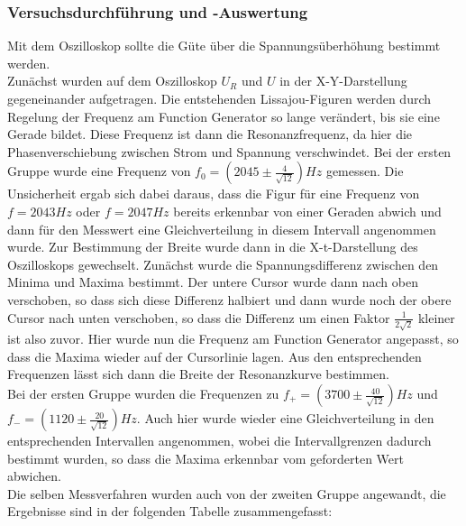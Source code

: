 \documentclass[a4paper, 11pt]{article}
\begin{document}
\subsubsection{Versuchsdurchführung und -Auswertung}
Mit dem Oszilloskop sollte die Güte über die Spannungsüberhöhung bestimmt werden. \\
Zunächst wurden auf dem Oszilloskop $U_R$ und $U$ in der X-Y-Darstellung gegeneinander aufgetragen. Die entstehenden Lissajou-Figuren werden durch Regelung der Frequenz am Function Generator so lange verändert, bis sie eine Gerade bildet. Diese Frequenz ist dann die Resonanzfrequenz, da hier die Phasenverschiebung zwischen Strom und Spannung verschwindet.
Bei der ersten Gruppe wurde eine Frequenz von $f_0 = (2045 \pm \frac{4}{\sqrt{12}}) Hz$ gemessen. Die Unsicherheit ergab sich dabei daraus, dass die Figur für eine Frequenz von $f = 2043 Hz$ oder $f = 2047 Hz$ bereits erkennbar von einer Geraden abwich und dann für den Messwert eine Gleichverteilung in diesem Intervall angenommen wurde.
Zur Bestimmung der Breite wurde dann in die X-t-Darstellung des Oszilloskops gewechselt. Zunächst wurde die Spannungsdifferenz zwischen den Minima und Maxima bestimmt. Der untere Cursor wurde dann nach oben verschoben, so dass sich diese Differenz halbiert und dann wurde noch der obere Cursor nach unten verschoben, so dass die Differenz um einen Faktor $\frac{1}{2\sqrt{2}}$ kleiner ist also zuvor. Hier wurde nun die Frequenz am Function Generator angepasst, so dass die Maxima wieder auf der Cursorlinie lagen. Aus den entsprechenden Frequenzen lässt sich dann die Breite der Resonanzkurve bestimmen.\\
Bei der ersten Gruppe wurden die Frequenzen zu $f_+ = (3700 \pm \frac{40}{\sqrt{12}}) Hz$ und $f_- = (1120 \pm \frac{20}{\sqrt{12}}) Hz$. Auch hier wurde wieder eine Gleichverteilung in den entsprechenden Intervallen angenommen, wobei die Intervallgrenzen dadurch bestimmt wurden, so dass die Maxima erkennbar vom geforderten Wert abwichen.\\
Die selben Messverfahren wurden auch von der zweiten Gruppe angewandt, die Ergebnisse sind in der folgenden Tabelle zusammengefasst:
\end{document}
